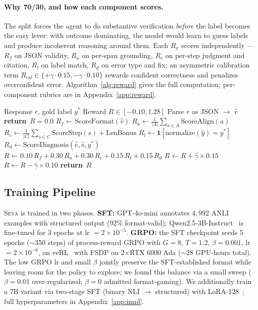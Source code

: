 \documentclass{article}
\providecommand{\RETURN}{\STATE \textbf{return}~}
\newcommand{\seva}{\textsc{Seva}\xspace}
\begin{document}
\paragraph{Why 70/30, and how each component scores.}
The split forces the agent to do substantive verification \emph{before} the label becomes the easy lever: with outcome dominating, the model would learn to guess labels and produce incoherent reasoning around them.
Each $R_x$ scores independently --- $R_f$ on JSON validity, $R_a$ on per-span grounding, $R_c$ on per-step judgment and citation, $R_l$ on label match, $R_d$ on error type and fix; an asymmetric calibration term $R_{\text{cal}}\!\in\!\{+\gamma{\cdot}0.15, -\gamma{\cdot}0.10\}$ rewards confident correctness and penalizes overconfident error.
Algorithm~\ref{alg:reward} gives the full computation; per-component rubrics are in Appendix~\ref{app:reward}.

\begin{algorithm}[t]
\small
\caption{Process Reward Computation}
\label{alg:reward}
\begin{algorithmic}[1]
\REQUIRE Response $r$, gold label $y^*$
\ENSURE Reward $R \in [-0.10, 1.28]$
\STATE Parse $r$ as JSON $\to$ $\hat{v}$
  \RETURN $R = 0.0$
\ENDIF
\STATE $R_f \gets \text{ScoreFormat}(\hat{v})$ 
\STATE $R_a \gets \frac{1}{|A|}\sum_{a \in A} \text{ScoreAlign}(a)$
\STATE $R_c \gets \frac{1}{|C|}\sum_{s \in C} \text{ScoreStep}(s) + \text{LenBonus}$
\STATE $R_l \gets \mathbf{1}[\text{normalize}(\hat{y}) = y^*]$
\STATE $R_d \gets \text{ScoreDiagnosis}(\hat{e}, \hat{s}, y^*)$
\STATE $R \gets 0.10\, R_f + 0.30\, R_a + 0.30\, R_c + 0.15\, R_l + 0.15\, R_d$
  \STATE $R \gets R + \hat{\gamma} \times 0.15$ 
\ELSE
  \STATE $R \gets R - \hat{\gamma} \times 0.10$ 
\ENDIF
\RETURN $R$
\end{algorithmic}
\end{algorithm}


\subsection{Training Pipeline}
\label{sec:training}

\seva is trained in two phases.
\textbf{SFT:} GPT-4o-mini annotates $4{,}992$ ANLI examples with structured output ($92\%$ format-valid); Qwen2.5-3B-Instruct~\citep{qwen2025qwen25} is fine-tuned for $3$ epochs at lr $=2{\times}10^{-5}$.
\textbf{GRPO:} the SFT checkpoint seeds 5 epochs ($\sim$350 steps) of process-reward GRPO with $G{=}8$, $T{=}1.2$, $\beta{=}0.001$, lr $=2{\times}10^{-6}$, on veRL~\citep{sheng2024hybridflow} with FSDP on 2$\times$RTX 6000 Ada ($\sim$28 GPU-hours total).
The low GRPO lr and small $\beta$ jointly preserve the SFT-established format while leaving room for the policy to explore; we found this balance via a small sweep ($\beta{=}0.01$ over-regularized; $\beta{=}0$ admitted format-gaming).
We additionally train a 7B variant via two-stage SFT (binary NLI $\to$ structured) with LoRA-128~\citep{hu2022lora}; full hyperparameters in Appendix~\ref{app:impl}.
\end{document}
